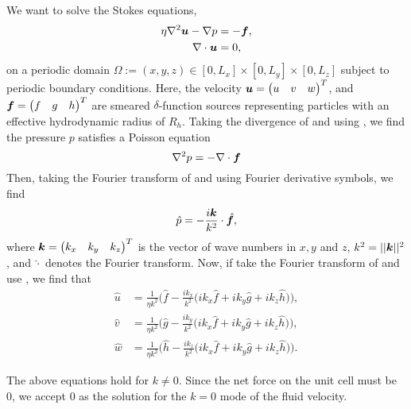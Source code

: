 We want to solve the Stokes equations,
\begin{align}
\displaystyle \eta \nabla^2 \boldsymbol u - \nabla p &= -\boldsymbol f, \label{momentum}\\
\nabla \cdot \boldsymbol u &= 0, \label{continuity}
\end{align}
on a periodic domain $\Omega := (x,y,z) \in[0,L_x] \times [0,L_y] \times [0,L_z]$ subject to periodic boundary conditions. Here, the velocity $\boldsymbol u = \begin{pmatrix}u & v & w \end{pmatrix}^T$, and $\boldsymbol f = \begin{pmatrix}f & g & h \end{pmatrix}^T$ are smeared $\delta$-function sources representing particles with an effective hydrodynamic radius of $R_h$. Taking the divergence of  and using , we find the pressure $p$ satisfies a Poisson equation
\begin{equation}\label{poisson}
\nabla^2 p = -\nabla \cdot \boldsymbol{f}
\end{equation}
Then, taking the Fourier transform of  and using Fourier derivative symbols, we find
\begin{equation}\label{psol}
\hat{p} = \displaystyle -\frac{i\boldsymbol{k}}{k^2}\cdot \hat{\boldsymbol f},
\end{equation}
where $\boldsymbol k = \begin{pmatrix} k_x & k_y & k_z\end{pmatrix}^T$ is the vector of wave numbers in $x, y$ and $z$, $k^2 = ||\boldsymbol k||^2$, and $\hat{\cdot}$ denotes the Fourier transform. Now, if take the Fourier transform of  and use , we find that
\begin{align}
\hat{u} &= \displaystyle \frac{1}{\eta k^2}\Big(\hat{f} - \frac{ik_x}{k^2}\big(ik_x \hat{f} + ik_y \hat{g} + ik_z \hat{h}\big)\Big),\\
\hat{v} &= \displaystyle \frac{1}{\eta k^2}\Big(\hat{g} - \frac{ik_y}{k^2}\big(ik_x \hat{f} + ik_y \hat{g} + ik_z \hat{h}\big)\Big),\\
\hat{w} &= \displaystyle \frac{1}{\eta k^2}\Big(\hat{h} - \frac{ik_z}{k^2}\big(ik_x \hat{f} + ik_y \hat{g} + ik_z \hat{h}\big)\Big).
\end{align}

The above equations hold for $k \neq 0$. Since the net force on the unit cell must be 0, we accept 0 as the solution for the $k=0$ mode of the fluid velocity.

